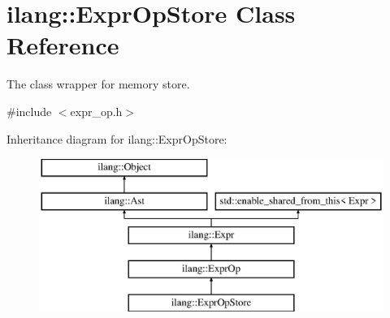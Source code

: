 \hypertarget{classilang_1_1_expr_op_store}{}\section{ilang\+:\+:Expr\+Op\+Store Class Reference}
\label{classilang_1_1_expr_op_store}


The class wrapper for memory store.  




{\ttfamily \#include $<$expr\+\_\+op.\+h$>$}

Inheritance diagram for ilang\+:\+:Expr\+Op\+Store\+:\begin{figure}[H]
\begin{center}
\leavevmode
\includegraphics[height=5.000000cm]{classilang_1_1_expr_op_store}
\end{center}
\end{figure}

